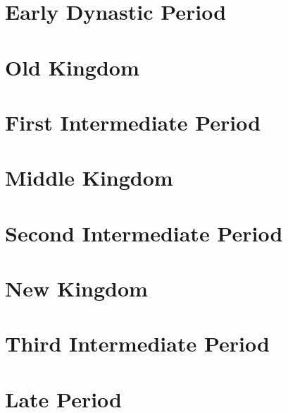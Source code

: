 \documentclass{article}
\begin{document}
\title{}
\author{Muchang Bahng}
\date{Spring 2024}

\maketitle
\tableofcontents
\pagebreak

\section{Early Dynastic Period}

\section{Old Kingdom}

\section{First Intermediate Period}

\section{Middle Kingdom}

\section{Second Intermediate Period}

\section{New Kingdom}

\section{Third Intermediate Period}

\section{Late Period}
\end{document}
